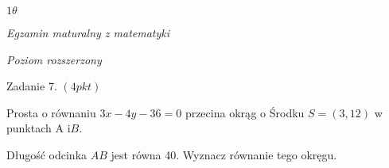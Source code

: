 \documentclass[a4paper,12pt]{article}
\begin{document}
$ 1\theta$

{\it Egzamin maturalny z matematyki}

{\it Poziom rozszerzony}

Zadanie 7. $(4pkt)$

Prosta o równaniu $3x-4y-36=0$ przecina okrąg o Środku $S=(3,12)$ w punktach A $\mathrm{i}B.$

Długość odcinka $AB$ jest równa 40. Wyznacz równanie tego okręgu.
\end{document}
